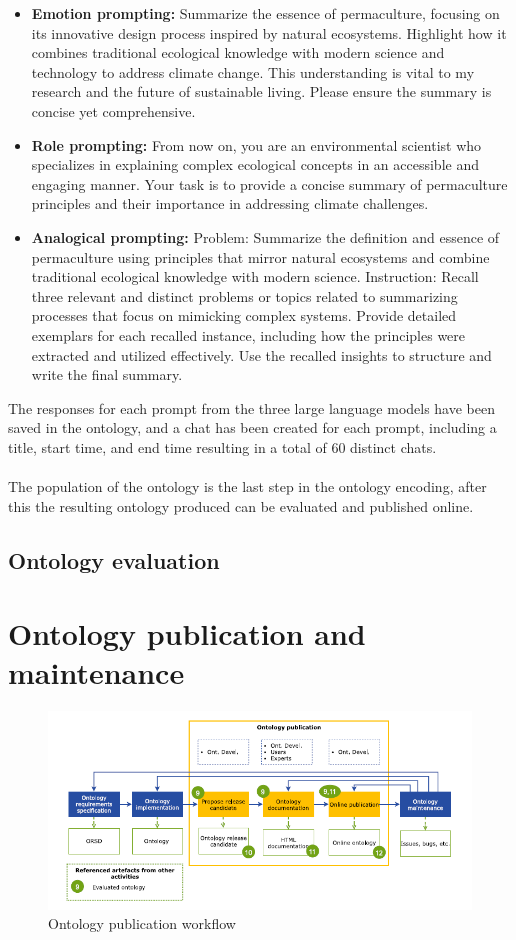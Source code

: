 \begin{itemize}
    \item \textbf{Emotion prompting:} Summarize the essence of permaculture, focusing on its innovative design process inspired by natural ecosystems. Highlight how it combines traditional ecological knowledge with modern science and technology to address climate change. This understanding is vital to my research and the future of sustainable living. Please ensure the summary is concise yet comprehensive.
    \item \textbf{Role prompting:} From now on, you are an environmental scientist who specializes in explaining complex ecological concepts in an accessible and engaging manner. Your task is to provide a concise summary of permaculture principles and their importance in addressing climate challenges.
    \item \textbf{Analogical prompting:} Problem: Summarize the definition and essence of permaculture using principles that mirror natural ecosystems and combine traditional ecological knowledge with modern science. Instruction: Recall three relevant and distinct problems or topics related to summarizing processes that focus on mimicking complex systems. Provide detailed exemplars for each recalled instance, including how the principles were extracted and utilized effectively. Use the recalled insights to structure and write the final summary.
\end{itemize}
The responses for each prompt from the three large language models have been saved in the ontology, and a chat has been created for each prompt, including a title, start time, and end time resulting in a total of 60 distinct chats.\\\\
The population of the ontology is the last step in the ontology encoding, after this the resulting ontology produced can be evaluated and published online.
\newpage
\subsection{Ontology evaluation}

\newpage
\section{Ontology publication and maintenance}
\begin{figure}[H]
    \centering
    \includegraphics[width=0.9\linewidth]{Figures/fig_25.png}
    \caption{Ontology publication workflow}
    \label{fig:enter-label}
\end{figure}